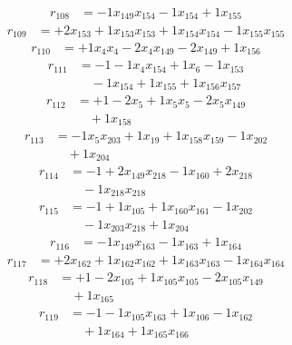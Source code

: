\[\begin{aligned}
r_{108} &= - 1 x_{149} x_{154} - 1 x_{154} + 1 x_{155}
\end{aligned}\]
\[\begin{aligned}
r_{109} &= + 2 x_{153} + 1 x_{153} x_{153} + 1 x_{154} x_{154} - 1 x_{155} x_{155}
\end{aligned}\]
\[\begin{aligned}
r_{110} &= + 1 x_{4} x_{4} - 2 x_{4} x_{149} - 2 x_{149} + 1 x_{156}
\end{aligned}\]
\[\begin{aligned}
r_{111} &= - 1 - 1 x_{4} x_{154} + 1 x_{6} - 1 x_{153} \\
 &\quad - 1 x_{154} + 1 x_{155} + 1 x_{156} x_{157}
\end{aligned}\]
\[\begin{aligned}
r_{112} &= + 1 - 2 x_{5} + 1 x_{5} x_{5} - 2 x_{5} x_{149} \\
 &\quad + 1 x_{158}
\end{aligned}\]
\[\begin{aligned}
r_{113} &= - 1 x_{5} x_{203} + 1 x_{19} + 1 x_{158} x_{159} - 1 x_{202} \\
 &\quad + 1 x_{204}
\end{aligned}\]
\[\begin{aligned}
r_{114} &= - 1 + 2 x_{149} x_{218} - 1 x_{160} + 2 x_{218} \\
 &\quad - 1 x_{218} x_{218}
\end{aligned}\]
\[\begin{aligned}
r_{115} &= - 1 + 1 x_{105} + 1 x_{160} x_{161} - 1 x_{202} \\
 &\quad - 1 x_{203} x_{218} + 1 x_{204}
\end{aligned}\]
\[\begin{aligned}
r_{116} &= - 1 x_{149} x_{163} - 1 x_{163} + 1 x_{164}
\end{aligned}\]
\[\begin{aligned}
r_{117} &= + 2 x_{162} + 1 x_{162} x_{162} + 1 x_{163} x_{163} - 1 x_{164} x_{164}
\end{aligned}\]
\[\begin{aligned}
r_{118} &= + 1 - 2 x_{105} + 1 x_{105} x_{105} - 2 x_{105} x_{149} \\
 &\quad + 1 x_{165}
\end{aligned}\]
\[\begin{aligned}
r_{119} &= - 1 - 1 x_{105} x_{163} + 1 x_{106} - 1 x_{162} \\
 &\quad + 1 x_{164} + 1 x_{165} x_{166}
\end{aligned}\]
